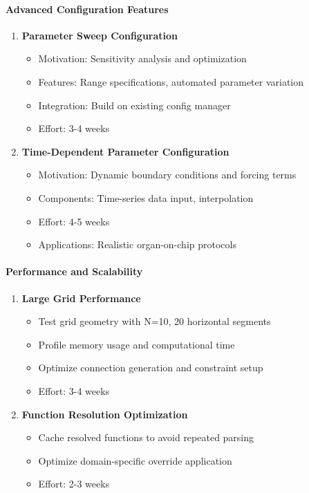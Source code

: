 \paragraph{Advanced Configuration Features}
\begin{enumerate}
    \item \textbf{Parameter Sweep Configuration}
    \begin{itemize}
        \item Motivation: Sensitivity analysis and optimization
        \item Features: Range specifications, automated parameter variation
        \item Integration: Build on existing config manager
        \item Effort: 3-4 weeks
    \end{itemize}
    
    \item \textbf{Time-Dependent Parameter Configuration}
    \begin{itemize}
        \item Motivation: Dynamic boundary conditions and forcing terms
        \item Components: Time-series data input, interpolation
        \item Effort: 4-5 weeks
        \item Applications: Realistic organ-on-chip protocols
    \end{itemize}
\end{enumerate}

\paragraph{Performance and Scalability}
\begin{enumerate}
    \item \textbf{Large Grid Performance}
    \begin{itemize}
        \item Test grid geometry with N=10, 20 horizontal segments
        \item Profile memory usage and computational time
        \item Optimize connection generation and constraint setup
        \item Effort: 3-4 weeks
    \end{itemize}
    
    \item \textbf{Function Resolution Optimization}
    \begin{itemize}
        \item Cache resolved functions to avoid repeated parsing
        \item Optimize domain-specific override application
        \item Effort: 2-3 weeks
    \end{itemize}
\end{enumerate}

